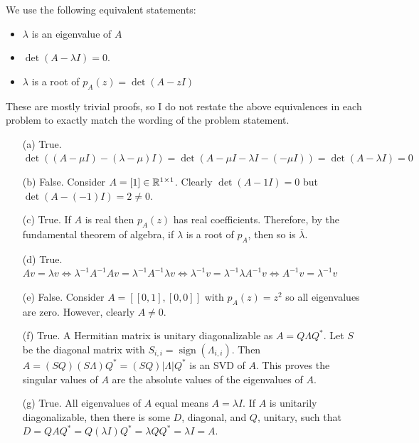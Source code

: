 \documentclass[10pt]{article}
\begin{document}
\begin{solution}[Solution]
We use the following equivalent statements:
\begin{itemize}[nolistsep]
    \item \( \lambda \) is an eigenvalue of \( A \) 
    \item \( \det(A-\lambda I) = 0 \).
    \item \( \lambda \) is a root of \( p_A(z) = \det(A-zI) \)
\end{itemize}

These are mostly trivial proofs, so I do not restate the above equivalences in each problem to exactly match the wording of the problem statement.

\begin{enumerate}
    \item[(a)] True. 
        \( \operatorname{det}((A-\mu I)-(\lambda-\mu)I) = \operatorname{det}(A-\mu I - \lambda I -(-\mu I)) = \operatorname{det}( A-\lambda I ) = 0 \) %
    \item[(b)] False. Consider \( A=[1]\in\mathbb{R}^{1\times 1} \). Clearly \( \det(A-1 I) = 0 \) but \( \det(A-(-1)I) = 2 \neq 0 \).
    \item[(c)] True. If \( A \) is real then \( p_A(z) \) has real coefficients. Therefore, by the fundamental theorem of algebra, if \( \lambda \) is a root of \( p_A \), then so is \( \overline{\lambda} \).
    \item[(d)] True. \( Av = \lambda v \Longleftrightarrow  \lambda^{-1}A^{-1}Av = \lambda^{-1}A^{-1} \lambda v \Longleftrightarrow \lambda^{-1}v = \lambda^{-1}\lambda A^{-1} v \Longleftrightarrow A^{-1} v = \lambda^{-1}v \) 
    \item[(e)] False. Consider \( A=[[0,1],[0,0]] \) with \( p_A(z) = z^2 \) so all eigenvalues are zero. However, clearly \( A\neq 0 \). 
    \item[(f)] True. A Hermitian matrix is unitary diagonalizable as \( A=Q\Lambda Q^* \). Let \( S \) be the diagonal matrix with \( S_{i,i} = \operatorname{sign}(\Lambda_{i,i}) \). Then \( A= (SQ) (S\Lambda) Q^* = (SQ)|\Lambda|Q^* \) is an SVD of \( A \). This proves the singular values of \( A \) are the absolute values of the eigenvalues of \( A \).
    \item[(g)] True. All eigenvalues of \( A \) equal means \( A=\lambda I \). If \( A \) is unitarily diagonalizable, then there is some \( D \), diagonal, and \( Q \), unitary, such that \( D=QAQ^*  = Q(\lambda I)Q^* = \lambda QQ^* = \lambda I = A \).  
\end{enumerate}

\end{solution}
\end{document}
